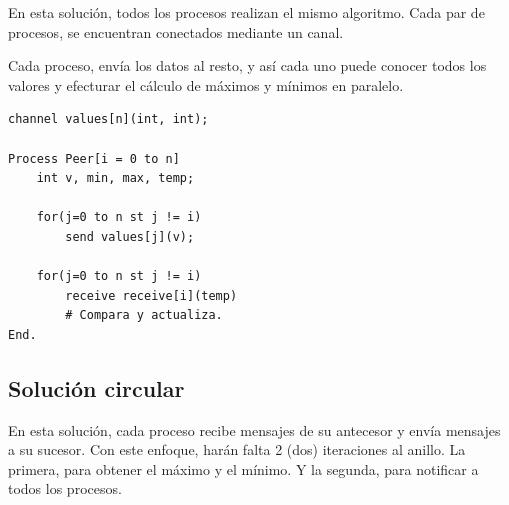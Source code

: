 \documentclass[a4paper, 10pt]{report}
\begin{document}
En esta solución, todos los procesos realizan el mismo algoritmo. Cada par de procesos, se encuentran conectados mediante un canal.

Cada proceso, envía los datos al resto, y así cada uno puede conocer todos los valores y efecturar el cálculo de máximos y mínimos en paralelo.

\begin{multicols}{2}
\begin{lstlisting}
channel values[n](int, int);

Process Peer[i = 0 to n]
	int v, min, max, temp;

	for(j=0 to n st j != i)
		send values[j](v);

	for(j=0 to n st j != i)
		receive receive[i](temp)
		# Compara y actualiza.
End.
\end{lstlisting}

\columnbreak
	
\centering
\vspace*{\fill}
\vspace*{\fill}
\end{multicols}

\subsection{Solución circular}

En esta solución, cada proceso recibe mensajes de su antecesor y envía mensajes a su sucesor. Con este enfoque, harán falta 2 (dos) iteraciones al anillo. La primera, para obtener el máximo y el mínimo. Y la segunda, para notificar a todos los procesos.
\end{document}
